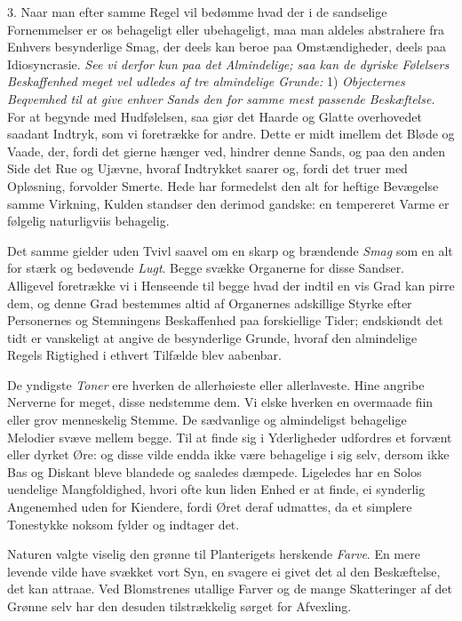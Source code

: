 \documentclass[12pt,a4paper]{article}
\newcommand{\opage}[1]{\marginnote{\footnotesize\textit{[#1]}}}
\begin{document}
3. Naar man efter samme Regel vil bedømme hvad der i de sandselige Fornemmelser er os
behageligt eller ubehageligt, maa man aldeles abstrahere fra Enhvers besynderlige Smag, der
deels kan beroe paa Omstændigheder, deels paa Idiosyncrasie. \emph{See vi derfor kun paa
det Almindelige; saa kan de dyriske Følelsers Beskaffenhed meget vel udledes af tre
almindelige Grunde:} 1) \emph{Objecternes Beqvemhed til at give enhver Sands den for samme
mest passende Beskæftelse.} For at begynde med Hudfølelsen,
\opage{232} saa giør det Haarde og Glatte overhovedet saadant Indtryk, som vi foretrække for andre.
Dette er midt imellem det Bløde og Vaade, der, fordi det gierne hænger ved, hindrer denne
Sands, og paa den anden Side det Rue og Ujævne, hvoraf Indtrykket saarer og, fordi det
truer med Opløsning, forvolder Smerte. Hede har formedelst den alt for heftige Bevægelse
samme Virkning, Kulden standser den derimod gandske: en tempereret Varme er følgelig
naturligviis behagelig.

Det samme gielder uden Tvivl saavel om en skarp og brændende \emph{Smag} som en alt for
stærk og bedøvende \emph{Lugt}. Begge svække Organerne for disse Sandser. Alligevel
foretrække vi i Henseende til begge hvad der indtil en vis Grad kan pirre dem, og denne
Grad bestemmes altid af Organernes adskillige Styrke efter Personernes og Stemningens
Beskaffenhed paa forskiellige Tider; endskiøndt det tidt er vanskeligt at angive de
besynderlige Grunde, hvoraf den almindelige Regels Rigtighed i ethvert Tilfælde blev
aabenbar.

De yndigste \emph{Toner} ere hverken de allerhøieste eller allerlaveste. Hine angribe
Nerverne for meget, disse nedstemme dem. Vi elske hverken en overmaade fiin eller grov
menneskelig Stemme. De sædvanlige og almindeligst behagelige Melodier svæve mellem begge.
Til at finde sig i Yderligheder udfordres et forvænt eller dyrket Øre: og disse vilde endda
ikke være behagelige i sig selv, dersom ikke Bas og Diskant bleve blandede
\opage{233} og saaledes dæmpede. Ligeledes har en Solos uendelige Mangfoldighed, hvori ofte kun liden
Enhed er at finde, ei synderlig Angenemhed uden for Kiendere, fordi Øret deraf udmattes, da
et simplere Tonestykke noksom fylder og indtager det.

Naturen valgte viselig den grønne til Planterigets herskende \emph{Farve}. En mere levende
vilde have svækket vort Syn, en svagere ei givet det al den Beskæftelse, det kan attraae.
Ved Blomstrenes utallige Farver og de mange Skatteringer af det Grønne selv har den desuden
tilstrækkelig sørget for Afvexling.
\end{document}
